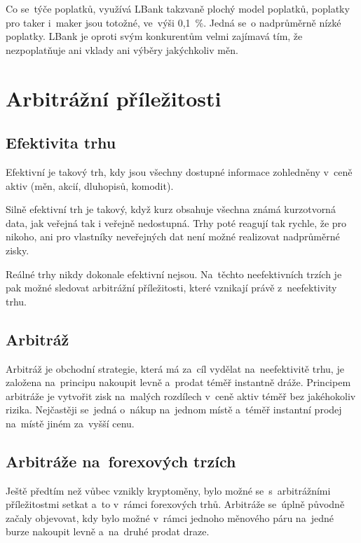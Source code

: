 \documentclass[thesis=B,czech]{FITthesis}[2019/03/21]
\begin{document}
Co se~týče poplatků, využívá LBank takzvaně plochý model poplatků, poplatky pro taker i~maker jsou totožné, ve~výši 0,1~\%. Jedná se~o nadprůměrně nízké poplatky. LBank je oproti svým konkurentům velmi zajímavá tím, že nezpoplatňuje ani vklady ani výběry jakýchkoliv měn. \cite{cryptowisser_lbank}


\section{Arbitrážní příležitosti}
\subsection{Efektivita trhu}
Efektivní je takový trh, kdy jsou všechny dostupné informace zohledněny v~ceně aktiv (měn, akcií, dluhopisů, komodit).\cite{efektivita_trhu}

Silně efektivní trh je takový, když kurz obsahuje všechna známá kurzotvorná data, jak veřejná tak i veřejně nedostupná. Trhy poté reagují tak rychle, že pro nikoho, ani pro vlastníky neveřejných dat není možné realizovat nadprůměrné zisky. \cite{efektivnost_trhu}

Reálné trhy nikdy dokonale efektivní nejsou. Na~těchto neefektivních trzích je pak možné sledovat arbitrážní příležitosti, které vznikají právě z~neefektivity trhu. \cite{pecev, what_is_arbitage} 

\subsection{Arbitráž}
Arbitráž je obchodní strategie, která má za~cíl vydělat na~neefektivitě trhu, je založena na~principu nakoupit levně a~prodat téměř instantně dráže. Principem arbitráže je vytvořit zisk na~malých rozdílech v~ceně aktiv téměř bez jakéhokoliv rizika. Nejčastěji se~jedná o~nákup na~jednom místě a~téměř instantní prodej na~místě jiném za~vyšší cenu. \cite{Capital}

\subsection{Arbitráže na~forexových trzích}
Ještě předtím než vůbec vznikly kryptoměny, bylo možné se~s~arbitrážními příležitostmi setkat a~to v~rámci forexových trhů. Arbitráže se~úplně původně začaly objevovat, kdy bylo možné v~rámci jednoho měnového páru na~jedné burze nakoupit levně a~na~druhé prodat draze. 
\end{document}
